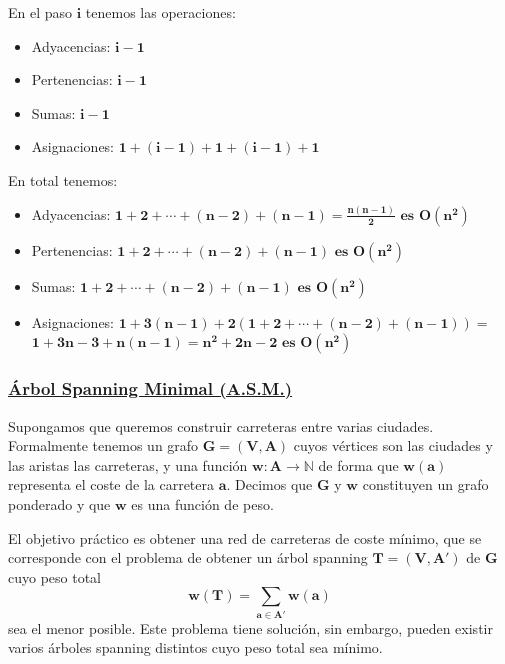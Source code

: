 \documentclass[twoside]{report}
\newcommand{\bs}[1]{\boldsymbol{#1}}
\begin{document}
        \noindent En el paso $\bs{i}$ tenemos las operaciones:
        \begin{itemize}
        \item Adyacencias: $\bs{i-1}$
        \item Pertenencias: $\bs{i-1}$
        \item Sumas: $\bs{i-1}$
        \item Asignaciones: $\bs{1+(i-1)+1+(i-1)+1}$
        \end{itemize}
\vspace{0.3cm}
        \noindent En total tenemos:
        \begin{itemize}
        \item Adyacencias:
        $\bs{1+2+\cdots+(n-2)+(n-1)=\frac{n(n-1)}{2} \mbox{  es  } O(n^2)}$
        \item Pertenencias: $\bs{1+2+\cdots+(n-2)+(n-1)\mbox{  es  }O(n^2)}$
        \item Sumas: $\bs{1+2+\cdots+(n-2)+(n-1) \mbox{  es  }O(n^2)}$
        \item Asignaciones: $\bs{1+3(n-1)+2\left(1+2+\cdots+(n-2)+(n-1)\right)=}$\\
        $\bs{1+3n-3+n(n-1)=n^2+2n-2 \mbox{  es  }O(n^2)}$
        \end{itemize}

\vspace{0.4cm}
\subsubsection{\underline{Árbol Spanning Minimal (A.S.M.)}}

Supongamos que queremos construir carreteras entre varias ciudades. Formalmente tenemos un grafo $\bs{G=(V,A)}$ cuyos vértices son las ciudades y las aristas las carreteras, y una función $\bs{w:A\rightarrow\mathbb{N}}$ de forma que $\bs{w(a)}$ representa el coste de la carretera $\bs{a}$. Decimos que $\bs{G}$ y $\bs{w}$ constituyen un grafo ponderado y que $\bs{w}$ es una función de peso.
\vspace{0.2cm}

El objetivo práctico es obtener una red de carreteras de coste mínimo, que se corresponde con el problema de obtener un árbol spanning $\bs{T=(V,A')}$ de $\bs{G}$ cuyo peso total $$\bs{w(T)=\sum_{a\in A'}w(a)}$$ sea el menor posible. Este problema tiene solución, sin embargo, pueden existir varios árboles spanning distintos cuyo peso total sea mínimo.
\vspace{0.6cm}
\end{document}
